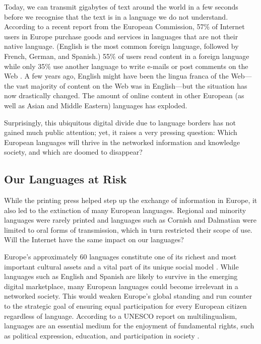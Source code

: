 \begin{multicols}{2}
Today, we can transmit gigabytes of text around the world in a few seconds before we recognise that the text is in a language we do not understand.
According to a recent report from the European Commission, 57\% of Internet users in Europe purchase goods and services in languages that are not their native language.
(English is the most common foreign language, followed by French, German, and Spanish.) 55\% of users read content in a foreign language while only 35\% use another language to write e-mails or post comments on the Web \cite{Meta48}.
A few years ago, English might have been the lingua franca of the Web---the vast majority of content on the Web was in English---but the situation has now drastically changed.
The amount of online content in other European (as well as Asian and Middle Eastern) languages has exploded.

Surprisingly, this ubiquitous digital divide due to language borders has not gained much public attention; yet, it raises a very pressing question: Which European languages will thrive in the networked information and knowledge society, and which are doomed to disappear?

\subsection{Our Languages at Risk}

While the printing press helped step up the exchange of information in Europe, it also led to the extinction of many European languages.
Regional and minority languages were rarely printed and languages such as Cornish and Dalmatian were limited to oral forms of transmission, which in turn restricted their scope of use.
Will the Internet have the same impact on our languages?


Europe's approximately 60 languages constitute one of its richest and most important cultural assets and a vital part of its unique social model \cite{Meta49}.
While languages such as English and Spanish are likely to survive in the emerging digital marketplace, many European languages could become irrelevant in a networked society.
This would weaken Europe's global standing and run counter to the strategic goal of ensuring equal participation for every European citizen regardless of language.
According to a UNESCO report on multilingualism, languages are an essential medium for the enjoyment of fundamental rights, such as political expression, education, and participation in society \cite{Meta50}. 


\end{multicols}
